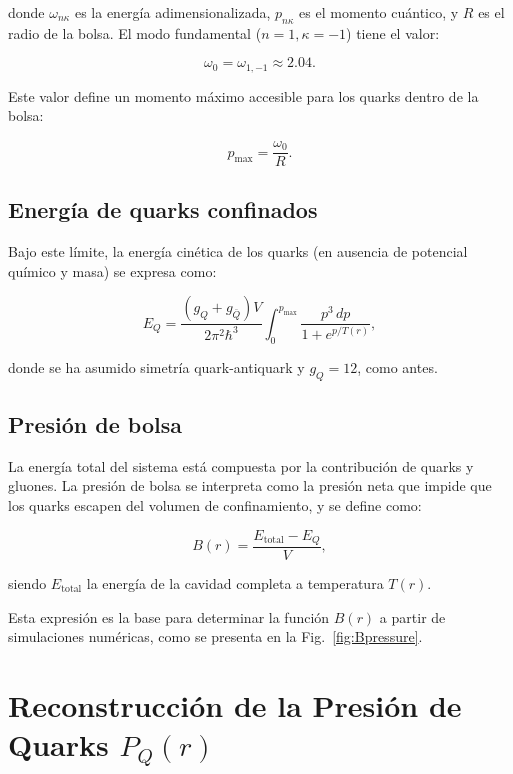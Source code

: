 donde \( \omega_{n\kappa} \) es la energía adimensionalizada, \( p_{n\kappa} \) es el momento cuántico, y \( R \) es el radio de la bolsa. El modo fundamental (\( n = 1, \kappa = -1 \)) tiene el valor:

\begin{equation}
\omega_0 = \omega_{1, -1} \approx 2.04.
\end{equation}

Este valor define un momento máximo accesible para los quarks dentro de la bolsa:

\begin{equation}
p_{\text{max}} = \frac{\omega_0}{R}.
\end{equation}

\subsection{Energía de quarks confinados}

Bajo este límite, la energía cinética de los quarks (en ausencia de potencial químico y masa) se expresa como:

\begin{equation}
E_Q = \frac{(g_Q + g_{\bar{Q}}) V}{2\pi^2 \hbar^3} \int_0^{p_{\text{max}}} \frac{p^3 \, dp}{1 + e^{p/T(r)}},
\end{equation}

donde se ha asumido simetría quark-antiquark y \( g_Q = 12 \), como antes.

\subsection{Presión de bolsa}

La energía total del sistema está compuesta por la contribución de quarks y gluones. La presión de bolsa se interpreta como la presión neta que impide que los quarks escapen del volumen de confinamiento, y se define como:

\begin{equation}
B(r) = \frac{E_{\text{total}} - E_Q}{V},
\end{equation}

siendo \( E_{\text{total}} \) la energía de la cavidad completa a temperatura \( T(r) \).

Esta expresión es la base para determinar la función \( B(r) \) a partir de simulaciones numéricas, como se presenta en la Fig.~\ref{fig:Bpressure}.


\section{Reconstrucci\'on de la Presi\'on de Quarks \( P_Q(r) \)}

